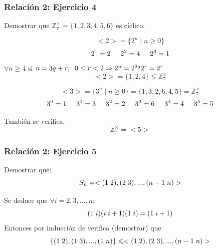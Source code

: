 \documentclass[11pt,a4paper]{article}
\begin{document}
\subsubsection*{Relación 2: Ejercicio 4}

Demostrar que $\mathbb{Z}_{7}^{\times} = \{1, 2, 3, 4, 5, 6\}$ es cíclico.

$$<2> = \{2^{n} \mid n \geq 0\}$$
$$2^{1} = 2 \hspace{0.5cm} 2^{2} = 4 \hspace{0.5cm} 2^{3} = 1$$
$\forall n \geq 4$ si $n = 3q+r, \hspace{0.2cm} 0 \leq r < 2 \Rightarrow 2^{n} = 2^{3q}2^{r} = 2^{r}$
$$<2> = \{1, 2, 4\}  \lneq \mathbb{Z}_{7}^{\times}$$

$$<3> = \{3^{n} \mid n \geq 0\} = \{1,3,2,6,4,5\} = \mathbb{Z}_{7}^{\times}$$
$$3^{0} = 1 \hspace{0.5cm} 3^{1} = 3 \hspace{0.5cm} 3^{2} = 2 \hspace{0.5cm} 3^{3} = 6 \hspace{0.5cm} 3^{4} = 4 \hspace{0.5cm} 3^{5} = 5$$

También se verifica:
$$\mathbb{Z}_{7}^{\times} = <5>$$

\subsubsection*{Relación 2: Ejercicio 5}

Demostrar que:
$$S_{n} = <(1 \hspace{0.1cm} 2), (2 \hspace{0.1cm} 3), ..., (n-1 \hspace{0.1cm} n)>$$

Se deduce que $\forall i = 2,3, ..., n$:
$$(1 \hspace{0.1cm} i)(i \hspace{0.1cm} i+1)(1 \hspace{0.1cm} i) = (1 \hspace{0.1cm} i+1)$$
Entonces por inducción de verifica (demostrar) que:
$$\{(1 \hspace{0.1cm} 2), (1 \hspace{0.1cm} 3), ..., (1 \hspace{0.1cm} n)\} \leqslant <(1 \hspace{0.1cm} 2), (2 \hspace{0.1cm} 3), ..., (n-1 \hspace{0.1cm} n)>$$
\end{document}
